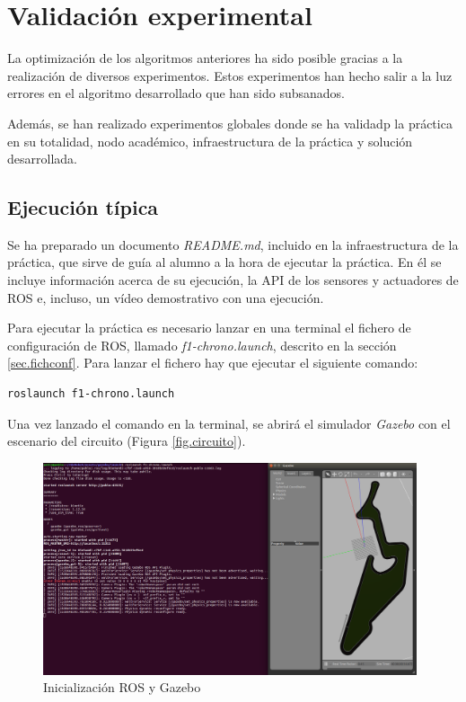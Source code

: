 \section{Validación experimental}
La optimización de los algoritmos anteriores ha sido posible gracias a la realización de diversos experimentos. Estos experimentos han hecho salir a la luz errores en el algoritmo desarrollado que han sido subsanados.

Además, se han realizado experimentos globales donde se ha validadp la práctica en su totalidad, nodo académico, infraestructura de la práctica y solución desarrollada.

\subsection{Ejecución típica}
Se ha preparado un documento \textit{README.md}, incluido en la infraestructura de la práctica, que sirve de guía al alumno a la hora de ejecutar la práctica. En él se incluye información acerca de su ejecución, la API de los sensores y actuadores de ROS e, incluso, un vídeo demostrativo con una ejecución.

Para ejecutar la práctica es necesario lanzar en una terminal el fichero de configuración de ROS, llamado \textit{f1-chrono.launch}, descrito en la sección \ref{sec.fichconf}. Para lanzar el fichero hay que ejecutar el siguiente comando:

\lstset{language=bash, breaklines=true, basicstyle=\footnotesize}
\begin{lstlisting}[frame=single]
roslaunch f1-chrono.launch
\end{lstlisting}

Una vez lanzado el comando en la terminal, se abrirá el simulador \textit{Gazebo} con el escenario del circuito (Figura \ref{fig.circuito}).

\begin{figure}[H]
  \begin{center}
    \includegraphics[width=0.98\textwidth]{figures/roslaunch_chrono.png}
		\caption{Inicialización ROS y Gazebo}
		\label{fig.roslaunchch}
		\end{center}
\end{figure}

